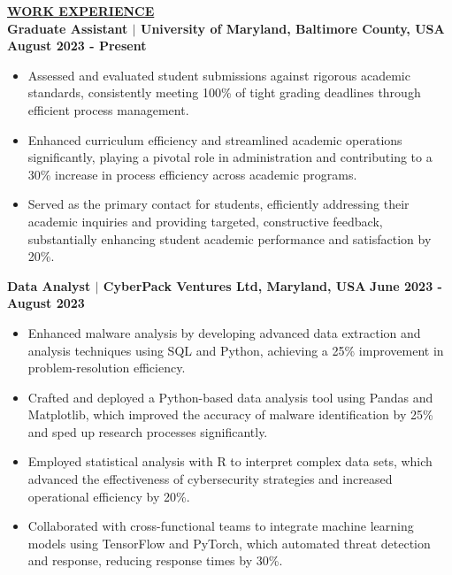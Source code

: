 \documentclass{article}
\begin{document}
\noindent \textbf{\underline{WORK EXPERIENCE}} \\
\noindent \textbf{Graduate Assistant $\mid$ University of Maryland, Baltimore County, USA}  \hfill \textbf{August 2023 - Present}
\begin{itemize}[noitemsep,nolistsep,leftmargin=*]
\item {\small Assessed and evaluated student submissions against rigorous academic standards, consistently meeting 100\% of tight grading deadlines through efficient process management.}
\item {\small Enhanced curriculum efficiency and streamlined academic operations significantly, playing a pivotal role in administration and contributing to a 30\% increase in process efficiency across academic programs.}
\item {\small Served as the primary contact for students, efficiently addressing their academic inquiries and providing targeted, constructive feedback, substantially enhancing student academic performance and satisfaction by 20\%.}
\end{itemize}

\vspace{2mm} 

\noindent \textbf{Data Analyst $\mid$ CyberPack Ventures Ltd, Maryland, USA} \hfill \textbf{June 2023 - August 2023}
\begin{itemize}[noitemsep,nolistsep,leftmargin=*]
\item {\small Enhanced malware analysis by developing advanced data extraction and analysis techniques using SQL and Python, achieving a 25\% improvement in problem-resolution efficiency.}
\item {\small Crafted and deployed a Python-based data analysis tool using Pandas and Matplotlib, which improved the accuracy of malware identification by 25\% and sped up research processes significantly.}
\item {\small Employed statistical analysis with R to interpret complex data sets, which advanced the effectiveness of cybersecurity strategies and increased operational efficiency by 20\%.}
\item {\small Collaborated with cross-functional teams to integrate machine learning models using TensorFlow and PyTorch, which automated threat detection and response, reducing response times by 30\%.}
\end{itemize}
\end{document}
